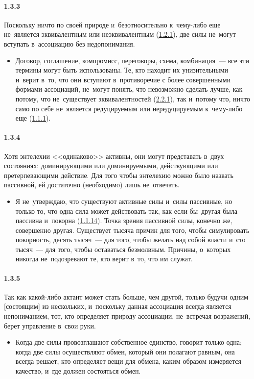 \paragraph{1.3.3}\hypertarget{par:1.3.3}{} Поскольку ничто по своей природе и~безотносительно к~чему-либо еще не~является эквивалентным или неэквивалентным (\hyperlink{par:1.2.1}{1.2.1}), две силы не~могут вступать в~ассоциацию без недопонимания. 
	\begin{itemize}
	\item Договор, соглашение, компромисс, переговоры, схема, комбинация~--- все эти термины могут быть использованы. Те, кто находит их унизительными и~верит в~то, что они вступают в~противоречие с более совершенными формами ассоциаций, не~могут понять, что невозможно сделать лучше, как потому, что не~существует эквивалентностей (\hyperlink{par:2.2.1}{2.2.1}), так и~потому что, ничто само по себе не~является редуцируемым или нередуцируемым к~чему-либо еще (\hyperlink{par:1.1.1}{1.1.1}).
	\end{itemize}

\paragraph{1.3.4}\hypertarget{par:1.3.4}{} Хотя энтелехии <<одинаково>> активны, они могут представать в~двух состояниях: доминирующими или доминируемыми, действующими или претерпевающими действие. Для того чтобы энтелехию можно было назвать пассивной, ей достаточно (необходимо) лишь не~отвечать.
	\begin{itemize}
	\item Я не~утверждаю, что существуют активные силы и~силы пассивные, но только то, что одна сила может действовать так, как если бы~другая была пассивна и~покорна (\hyperlink{par:1.1.14}{1.1.14}). Точка зрения пассивной силы, конечно же, совершенно другая. Существует тысяча причин для того, чтобы симулировать покорность, десять тысяч~--- для того, чтобы желать над собой власти и~сто тысяч~--- для того, чтобы оставаться безмолвным. Причины, о~которых никогда не~подозревают те, кто верит в~то, что им служат.
	\end{itemize}

\paragraph{1.3.5}\hypertarget{par:1.3.5}{} Так как какой-либо актант может стать больше, чем другой, только будучи одним [состоящим] из нескольких, и~поскольку данная ассоциация всегда является непониманием, тот, кто определяет природу ассоциации, не~встречая возражений, берет управление в~свои руки. 
	\begin{itemize}
	\item Когда две силы провозглашают собственное единство, говорит только одна; когда две силы осуществляют обмен, который они полагают равным, она всегда решает, кто определяет вещи для обмена, каким образом измеряется качество, и~где должен состояться обмен.
	\end{itemize}

